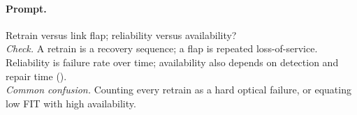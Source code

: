 \paragraph{Prompt.} Retrain versus link flap; reliability versus availability?\\
\textit{Check.} A retrain is a recovery sequence; a flap is repeated
loss-of-service. Reliability is failure rate over time; availability also
depends on detection and repair time ().\\
\textit{Common confusion.} Counting every retrain as a hard optical failure, or
equating low FIT with high availability.
